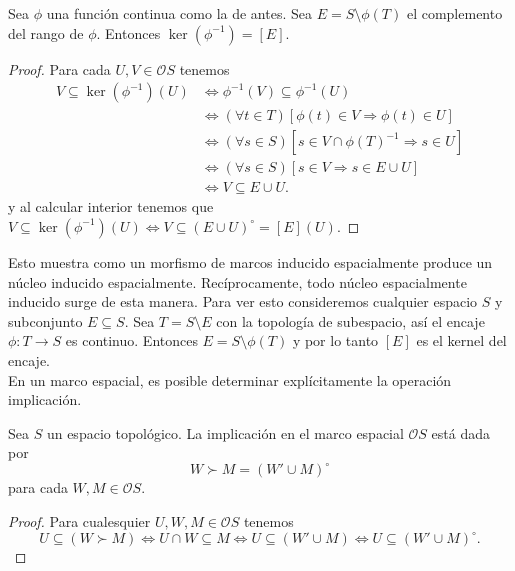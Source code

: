 \begin{thm}
    Sea $\phi$ una función continua como la de antes. Sea $E=S\setminus \phi(T)$ el complemento del rango de $\phi$. Entonces $\ker(\phi^{-1})=[E]$.
\end{thm}

\begin{proof}
    Para cada $U,V\in \mathcal{O}S$ tenemos 
    \[
    \begin{split}
    V\subseteq \ker(\phi^{-1})(U) &\Leftrightarrow \phi^{-1}(V)\subseteq \phi^{-1}(U)\\
    & \Leftrightarrow (\forall t\in T)[\phi(t)\in V\Rightarrow \phi(t)\in U]\\
    & \Leftrightarrow (\forall s\in S)[s\in V\cap \phi(T)^{-1}\Rightarrow s\in U]\\
    & \Leftrightarrow (\forall s\in S)[s\in V\Rightarrow s\in E\cup U]\\
    & \Leftrightarrow V\subseteq E\cup U.
    \end{split}
    \]
    y al calcular interior tenemos que $V\subseteq \ker(\phi^{-1})(U)\Leftrightarrow V\subseteq (E\cup U)^\circ =[E](U)$.
\end{proof}

Esto muestra como un morfismo de marcos inducido espacialmente produce un núcleo inducido espacialmente. Recíprocamente, todo núcleo espacialmente inducido surge de esta manera. Para ver esto consideremos cualquier espacio $S$ y subconjunto $E\subseteq S$. Sea $T=S\setminus E$ con la topología de subespacio, así el encaje $\phi\colon T\to S$ es continuo. Entonces $E=S\setminus \phi(T)$ y por lo tanto $[E]$ es el kernel del encaje.\\

En un marco espacial, es posible determinar explícitamente la operación implicación.

\begin{lem}\label{ImplicacionTop}
    Sea $S$ un espacio topológico. La implicación en el marco espacial $\mathcal{O}S$ está dada por 
    \[
    W\succ M=(W'\cup M)^\circ
    \]
    para cada $W, M\in \mathcal{O}S$.
\end{lem}

\begin{proof}
    Para cualesquier $U, W, M\in \mathcal{O}S$ tenemos 
    \[
    U\subseteq (W\succ M)\Leftrightarrow U\cap W\subseteq M\Leftrightarrow U\subseteq (W'\cup M)\Leftrightarrow U\subseteq (W'\cup M)^\circ.
    \]
\end{proof}

